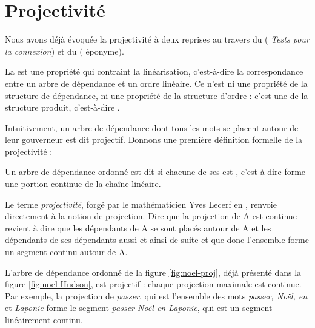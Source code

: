 \section{Projectivité}\label{sec:3.5.14}

Nous avons déjà évoquée la projectivité à deux reprises au travers du  ( \textit{Tests pour la connexion}) et du  ( éponyme).

La  est une propriété qui contraint la linéarisation, c’est-à-dire la correspondance entre un arbre de dépendance et un ordre linéaire. Ce n’est ni une propriété de la structure de dépendance, ni une propriété de la structure d’ordre : c’est une  de la structure produit, c’est-à-dire  .

Intuitivement, un arbre de dépendance dont tous les mots se placent autour de leur gouverneur est dit projectif. Donnons une première définition formelle de la projectivité :

{Un arbre de dépendance ordonné est dit  si chacune de ses  est , c’est-à-dire forme une portion continue de la chaîne linéaire.}

Le terme \textit{projectivité}, forgé par le mathématicien Yves Lecerf en \citeyear{lecerf1960programme}, renvoie directement à la notion de projection. Dire que la projection de A est continue revient à dire que les dépendants de A se sont placés autour de A et les dépendants de ses dépendants aussi et ainsi de suite et que donc l’ensemble forme un segment continu autour de A.

L’arbre de dépendance ordonné de la figure \ref{fig:noel-proj}, déjà présenté dans la figure \ref{fig:noel-Hudson}, est projectif : chaque projection maximale est continue. Par exemple, la projection de \textit{passer}, qui est l’ensemble des mots \textit{passer, Noël, en} et \textit{Laponie} forme le segment \textit{passer Noël en Laponie}, qui est un segment linéairement continu.

